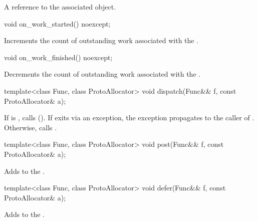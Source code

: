 \begin{itemdescr}
\pnum
\returns A reference to the associated  object.
\end{itemdescr}

\begin{itemdecl}
void on_work_started() noexcept;
\end{itemdecl}

\begin{itemdescr}
\pnum
\effects Increments the count of outstanding work associated with the .
\end{itemdescr}

\begin{itemdecl}
void on_work_finished() noexcept;
\end{itemdecl}

\begin{itemdescr}
\pnum
\effects Decrements the count of outstanding work associated with the .
\end{itemdescr}

\begin{itemdecl}
template<class Func, class ProtoAllocator>
  void dispatch(Func&& f, const ProtoAllocator& a);
\end{itemdecl}

\begin{itemdescr}
\pnum
\effects If  is , calls  (). \enternote If  exits via an exception, the exception propagates to the caller of . \exitnote Otherwise, calls .
\end{itemdescr}

\begin{itemdecl}
template<class Func, class ProtoAllocator>
  void post(Func&& f, const ProtoAllocator& a);
\end{itemdecl}

\begin{itemdescr}
\pnum
\effects Adds  to the .
\end{itemdescr}

\begin{itemdecl}
template<class Func, class ProtoAllocator>
  void defer(Func&& f, const ProtoAllocator& a);
\end{itemdecl}

\begin{itemdescr}
\pnum
\effects Adds  to the .
\end{itemdescr}



